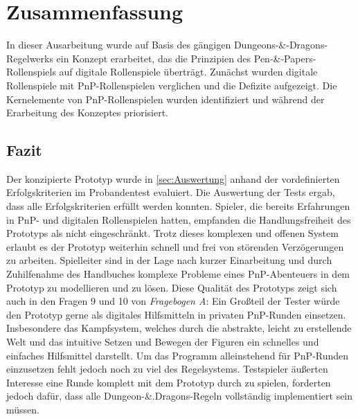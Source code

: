 \chapter{Zusammenfassung}
\label{conclusion}
In dieser Ausarbeitung wurde auf Basis des gängigen Dungeons-\&-Dragons-Regel\-werks ein Konzept erarbeitet, das die Prinzipien des Pen-\&-Papers-Rollenspiels auf digitale Rollenspiele überträgt. Zunächst wurden digitale Rollenspiele mit PnP-Rollenspielen verglichen und die Defizite aufgezeigt. Die Kernelemente von PnP-Rollenspielen wurden identifiziert und während der Erarbeitung des Konzeptes priorisiert.\\

\section{Fazit}
Der konzipierte Prototyp wurde in \ref{sec:Auswertung} anhand der vordefinierten Erfolgskriterien im Probandentest evaluiert. Die Auswertung der Tests ergab, dass alle Erfolgskriterien erfüllt werden konnten. Spieler, die bereits Erfahrungen in PnP- und digitalen Rollenspielen hatten, empfanden die Handlungsfreiheit des Prototyps als nicht eingeschränkt. Trotz dieses komplexen und offenen System erlaubt es der Prototyp weiterhin schnell und frei von störenden Verzögerungen zu arbeiten. Spielleiter sind in der Lage nach kurzer Einarbeitung und durch Zuhilfenahme des Handbuches komplexe Probleme eines PnP-Abenteuers in dem Prototyp zu modellieren und zu lösen. Diese Qualität des Prototyps zeigt sich auch in den Fragen 9 und 10 von \emph{Fragebogen A}: Ein Großteil der Tester würde den Prototyp gerne als digitales Hilfsmitteln in privaten PnP-Runden einsetzen. Insbesondere das Kampfsystem, welches durch die abstrakte, leicht zu erstellende Welt und das intuitive Setzen und Bewegen der Figuren ein schnelles und einfaches Hilfsmittel darstellt.\newline
Um das Programm alleinstehend für PnP-Runden einzusetzen fehlt jedoch noch zu viel des Regelsystems. Testspieler äußerten Interesse eine Runde komplett mit dem Prototyp durch zu spielen, forderten jedoch dafür, dass alle Dungeon-\&.Dragons-Regeln vollständig implementiert sein müssen.



